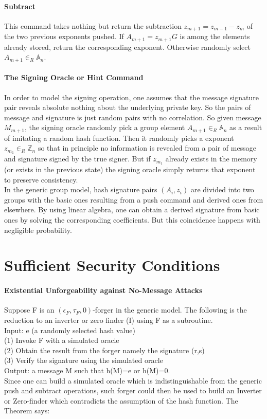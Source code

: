 \documentclass[18]{article}
\begin{document}
\paragraph{Subtract}
This command takes nothing but return the subtraction $z_{m+1}=z_{m-1}-z_m$ of the two previous exponents pushed. If $A_{m+1}=z_{m+1}G$ is among the elements already stored, return the corresponding exponent. Otherwise randomly select $A_{m+1} \in _R \mathbb{A}_n$.
\paragraph{The Signing Oracle or Hint Command}
In order to model the signing operation, one assumes that the message signature pair reveals absolute nothing about the underlying private key. So the pairs of message and signature is just random pairs with no correlation. So given message $M_{m+1}$, the signing oracle randomly pick a group element $A_{m+1}\in _R\mathbb{A}_n$ as a result of imitating a random hash function.
Then it randomly picks a exponent $z_{m_1}\in _R\mathbb{Z}_n$ so that in principle no information is revealed from a pair of message and signature signed by the true signer. But if $z_{m_1}$ already exists in the memory (or exists in the previous state) the signing oracle simply returns that exponent to preserve consistency.\\
In the generic group model, hash signature pairs $(A_i,z_i)$ are divided into two groups with the basic ones resulting from a push command and derived ones from elsewhere. By using linear algebra, one can obtain a derived signature from basic ones by solving the corresponding coefficients. But this coincidence happens with negligible probability.

\section{Sufficient Security Conditions}
\paragraph{Existential Unforgeability against No-Message Attacks}
Suppose F is an $(\epsilon_F,\tau_F,0)$-forger in the generic model. The following is the reduction to an inverter or zero finder (I) using F as a subroutine.\\
Input: e (a randomly selected hash value)\\
(1) Invoke F with a simulated oracle\\
(2) Obtain the result from the forger namely the signature (r,s)\\
(3) Verify the signature using the simulated oracle\\
Output:  a message M such that h(M)=e or h(M)=0.\\
Since one can build a simulated oracle which is indistinguishable from the generic push and subtract operations, such forger could then be used to build an Inverter or Zero-finder which contradicts the assumption of the hash function.
The Theorem says:
\end{document}
